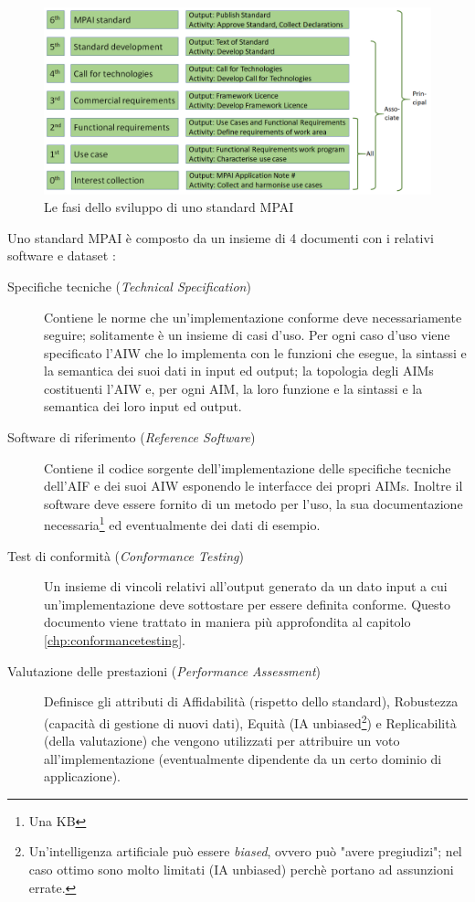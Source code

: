 \begin{figure}[h]
    \centering
    \includegraphics[width=\textwidth]{img/mpai-standard-stages.png}
    \caption{Le fasi dello sviluppo di uno standard \acs{MPAI} \cite{leonardoBlogNewWayDevelop2020}}
    \label{fig:mpai-standard-stages}
\end{figure}

Uno standard \ac{MPAI} è composto da un insieme di 4 documenti con i relativi software e dataset \cite{mpaiStructureMPAIStandards}:
\begin{description}
    \item[Specifiche tecniche (\textit{Technical Specification})] Contiene le norme che un'implementazione conforme deve necessariamente seguire; solitamente è un insieme di casi d'uso. Per ogni caso d'uso viene specificato l'\ac{AIW} che lo implementa con le funzioni che esegue, la sintassi e la semantica dei suoi dati in input ed output; la topologia degli \acp{AIM} costituenti l'\ac{AIW} e, per ogni \ac{AIM}, la loro funzione e la sintassi e la semantica dei loro input ed output. 
    \item[Software di riferimento (\textit{Reference Software})] Contiene il codice sorgente dell'implementazione delle specifiche tecniche dell'\ac{AIF} e dei suoi \ac{AIW} esponendo le interfacce dei propri \acp{AIM}. Inoltre il software deve essere fornito di un metodo per l'uso, la sua documentazione necessaria\footnote{Una \ac{KB}} ed eventualmente dei dati di esempio.
    \item[Test di conformità (\textit{Conformance Testing})] Un insieme di vincoli relativi all'output generato da un dato input a cui un'implementazione deve sottostare per essere definita conforme. Questo documento viene trattato in maniera più approfondita al capitolo \ref{chp:conformancetesting}.
    \item[Valutazione delle prestazioni (\textit{Performance Assessment})] Definisce gli attributi di Affidabilità (rispetto dello standard), Robustezza (capacità di gestione di nuovi dati), Equità (IA unbiased\footnote{Un'intelligenza artificiale può essere \textit{biased}, ovvero può "avere pregiudizi"; nel caso ottimo sono molto limitati (IA unbiased) perchè portano ad assunzioni errate.}) e Replicabilità (della valutazione) che vengono utilizzati per attribuire un voto all'implementazione (eventualmente dipendente da un certo dominio di applicazione).
\end{description}

